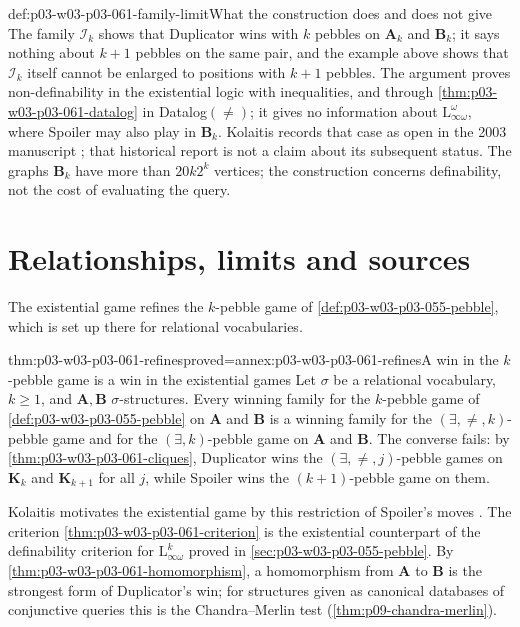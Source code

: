 \begin{hbwarning}{def:p03-w03-p03-061-family-limit}{What the construction does and does not give}
The family \(\mathcal I_k\) shows that Duplicator wins with \(k\) pebbles on
\(\mathbf A_k\) and \(\mathbf B_k\); it says nothing about \(k+1\) pebbles on
the same pair, and the example above shows that \(\mathcal I_k\) itself
cannot be enlarged to positions with \(k+1\) pebbles. The argument proves
non-definability in the existential logic with inequalities, and through
\cref{thm:p03-w03-p03-061-datalog} in Datalog\((\neq)\); it gives no
information about \(\mathrm L^\omega_{\infty\omega}\), where Spoiler may also
play in \(\mathbf B_k\). Kolaitis records that case as open in the
2003 manuscript \cite[p.~79]{Kolaitis2003ExpressivePowerNotes}; that
historical report is not a claim about its subsequent status. The graphs \(\mathbf B_k\)
have more than \(20k2^k\) vertices; the construction concerns definability,
not the cost of evaluating the query.
\end{hbwarning}

\section{Relationships, limits and sources}
\label{sec:p03-w03-p03-061-relations}

The existential game refines the \(k\)-pebble game of
\cref{def:p03-w03-p03-055-pebble}, which is set up there for relational
vocabularies.

\begin{hblemma}{thm:p03-w03-p03-061-refines}{proved=annex:p03-w03-p03-061-refines}{A win in the \(k\)-pebble game is a win in the existential games}
Let \(\sigma\) be a relational vocabulary, \(k\ge1\), and \(\mathbf A,\mathbf
B\) \(\sigma\)-structures. Every winning family for the \(k\)-pebble game of
\cref{def:p03-w03-p03-055-pebble} on \(\mathbf A\) and \(\mathbf B\) is a
winning family for the \((\exists,\neq,k)\)-pebble game and for the
\((\exists,k)\)-pebble game on \(\mathbf A\) and \(\mathbf B\). The converse
fails: by \cref{thm:p03-w03-p03-061-cliques}, Duplicator wins the
\((\exists,\neq,j)\)-pebble games on \(\mathbf K_k\) and \(\mathbf K_{k+1}\)
for all \(j\), while Spoiler wins the \((k+1)\)-pebble game on them.
\end{hblemma}

Kolaitis motivates the existential game by this restriction of Spoiler's
moves \cite[p.~71]{Kolaitis2003ExpressivePowerNotes}. The criterion
\cref{thm:p03-w03-p03-061-criterion} is the existential counterpart of the
definability criterion for \(\mathrm L^k_{\infty\omega}\) proved in
\cref{sec:p03-w03-p03-055-pebble}. By \cref{thm:p03-w03-p03-061-homomorphism},
a homomorphism from \(\mathbf A\) to \(\mathbf B\) is the strongest form of
Duplicator's win; for structures given as canonical databases of conjunctive
queries this is the Chandra--Merlin test (\cref{thm:p09-chandra-merlin}).

